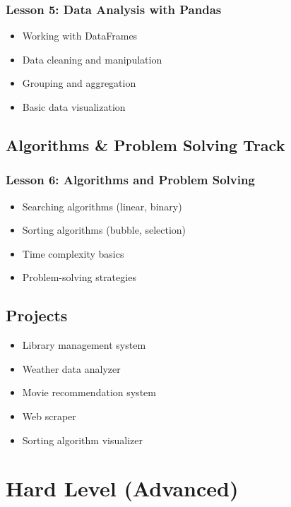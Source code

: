 \documentclass[11pt,letterpaper]{article}
\begin{document}
\subsubsection{Lesson 5: Data Analysis with Pandas}
\begin{itemize}[leftmargin=*]
    \item Working with DataFrames
    \item Data cleaning and manipulation
    \item Grouping and aggregation
    \item Basic data visualization
\end{itemize}

\subsection{Algorithms \& Problem Solving Track}

\subsubsection{Lesson 6: Algorithms and Problem Solving}
\begin{itemize}[leftmargin=*]
    \item Searching algorithms (linear, binary)
    \item Sorting algorithms (bubble, selection)
    \item Time complexity basics
    \item Problem-solving strategies
\end{itemize}

\subsection{Projects}
\begin{itemize}[leftmargin=*]
    \item Library management system
    \item Weather data analyzer
    \item Movie recommendation system
    \item Web scraper
    \item Sorting algorithm visualizer
\end{itemize}

\section{Hard Level (Advanced)}
\end{document}
